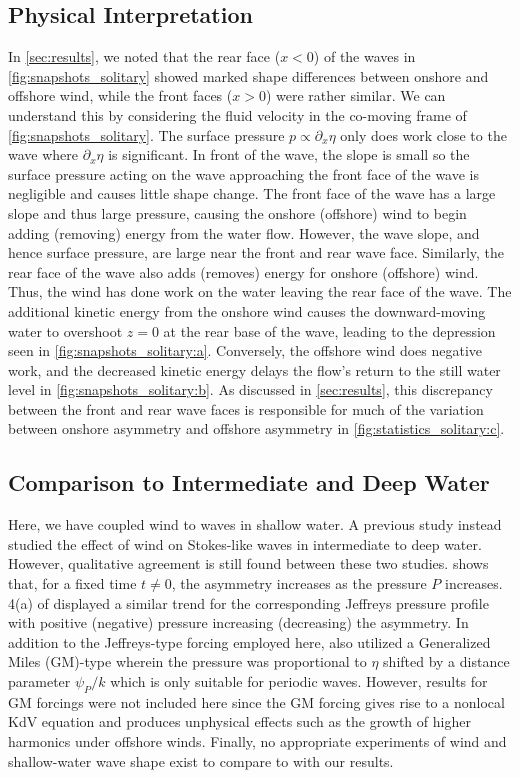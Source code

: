 \documentclass{jfm}
\begin{document}
\subsection{\label{sec:physical_reason} Physical Interpretation}
In \cref{sec:results}, we noted that the rear face ($x<0$) of the waves
in \cref{fig:snapshots_solitary} showed marked shape differences between
onshore and offshore wind, while the front faces ($x>0$) were rather
similar.
We can understand this by considering the fluid velocity in the
co-moving frame of \cref{fig:snapshots_solitary}.
The surface pressure $p \propto \partial_x \eta$ only does work
close to the wave where $\partial_x \eta$ is significant.
In front of the wave, the slope is small so the surface pressure acting
on the wave approaching the front face of the wave is negligible and
causes little shape change.
The front face of the wave has a large slope and thus large pressure,
causing the onshore (offshore) wind to begin adding (removing) energy
from the water flow.
However, the wave slope, and hence surface pressure, are large near the
front and rear wave face.
Similarly, the rear face of the wave also adds (removes) energy for
onshore (offshore) wind.
Thus, the wind has done work on the water leaving the rear face of the
wave.
The additional kinetic energy from the onshore wind causes the
downward-moving water to overshoot $z=0$ at the rear base of the wave,
leading to the depression seen in \cref{fig:snapshots_solitary:a}.
Conversely, the offshore wind does negative work, and the decreased
kinetic energy delays the flow's return to the still water level in
\cref{fig:snapshots_solitary:b}.
As discussed in \cref{sec:results}, this discrepancy between the front
and rear wave faces is responsible for much of the variation between
onshore asymmetry and offshore asymmetry in
\cref{fig:statistics_solitary:c}.

\subsection{Comparison to Intermediate and Deep Water}
Here, we have coupled wind to waves in shallow water.
A previous study \citep{zdyrski2020wind} instead studied the effect of
wind on Stokes-like waves in intermediate to deep water.
However, qualitative agreement is still found between these two studies.
 shows that, for a fixed time $t \neq 0$,
the asymmetry increases as the pressure $P$ increases.
\Figname{} 4(a) of \citet{zdyrski2020wind} displayed a similar trend for
the corresponding Jeffreys pressure profile with positive (negative)
pressure increasing (decreasing) the asymmetry.
In addition to the Jeffreys-type forcing employed here,
\citet{zdyrski2020wind} also utilized a Generalized Miles (GM)-type
wherein the pressure was proportional to $\eta$ shifted by a distance
parameter $\psi_P/k$ which is only suitable for periodic waves.
However, results for GM forcings were not included here since the GM
forcing gives rise to a nonlocal KdV equation and produces unphysical
effects such as the growth of higher harmonics under offshore winds.
Finally, no appropriate experiments of wind and shallow-water wave shape
exist to compare to with our results.
\end{document}
